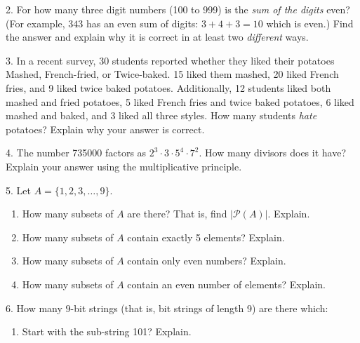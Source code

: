 \documentclass[10pt,]{book}
\theoremstyle{plain}
\theoremstyle{definition}
\theoremstyle{definition}
\theoremstyle{definition}
\numberwithin{equation}{chapter}
\def\pow{\mathcal P}
\begin{document}
\begin{exerciselist}
\begin{enumerate}[label=(\alph*)]
\end{enumerate}
\par\smallskip
\item[2.]\hypertarget{exercise-125}{}
            For how many three digit numbers (100 to 999) is the \emph{sum of the digits} even? (For example, \(343\) has an even sum of digits: \(3+4+3 = 10\) which is even.) Find the answer and explain why it is correct in at least two \emph{different} ways.
\par\smallskip
\item[3.]\hypertarget{exercise-126}{}
            In a recent survey, 30 students reported whether they liked their potatoes Mashed, French-fried, or Twice-baked. 15 liked them mashed, 20 liked French fries, and 9 liked twice baked potatoes. Additionally, 12 students liked both mashed and fried potatoes, 5 liked French fries and twice baked potatoes, 6 liked mashed and baked, and 3 liked all three styles. How many students
            \emph{hate} potatoes? Explain why your answer is correct.
\par\smallskip
\item[4.]\hypertarget{exercise-127}{}
          The number 735000 factors as \(2^3 \cdot 3 \cdot 5^4 \cdot 7^2\). How many divisors does it have? Explain your answer using the multiplicative principle.
\par\smallskip
\item[5.]\hypertarget{exercise-128}{}
            Let \(A = \{1,2,3,\ldots,9\}\).
\leavevmode%
\begin{enumerate}[label=(\alph*)]
\item\hypertarget{li-780}{}
                How many subsets of \(A\) are there? That is, find \(|\pow(A)|\). Explain.


\item\hypertarget{li-781}{}
                How many subsets of \(A\) contain exactly 5 elements? Explain.


\item\hypertarget{li-782}{}
                How many subsets of \(A\) contain only even numbers? Explain.


\item\hypertarget{li-783}{}
                How many subsets of \(A\) contain an even number of elements? Explain.


\end{enumerate}
\par\smallskip
\item[6.]\hypertarget{exercise-129}{}
            How many \(9\)-bit strings (that is, bit strings of length 9) are there which:
\leavevmode%
\begin{enumerate}[label=(\alph*)]
\item\hypertarget{li-784}{}
                Start with the sub-string 101? Explain.



\end{enumerate}
\end{exerciselist}
\end{document}
